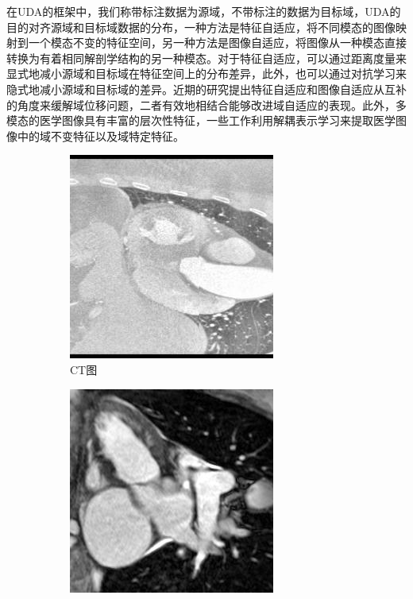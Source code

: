 在UDA的框架中，我们称带标注数据为源域，不带标注的数据为目标域，UDA的目的对齐源域和目标域数据的分布，一种方法是特征自适应\cite{long2017deep, sun2016deep, wu2020cf, wu2021unsupervised, dou2018pnp, tsai2018learning, vesal2021adapt}，将不同模态的图像映射到一个模态不变的特征空间，另一种方法是图像自适应\cite{zhu2017unpaired}，将图像从一种模态直接转换为有着相同解剖学结构的另一种模态。对于特征自适应，可以通过距离度量来显式地减小源域和目标域在特征空间上的分布差异，此外，也可以通过对抗学习来隐式地减小源域和目标域的差异。近期的研究\cite{hoffman2018cycada,chen2019synergistic}提出特征自适应和图像自适应从互补的角度来缓解域位移问题，二者有效地相结合能够改进域自适应的表现。此外，多模态的医学图像具有丰富的层次性特征，一些工作\cite{yang2019unsupervised, chartsias2019disentangled, pei2021disentangle}利用解耦表示学习来提取医学图像中的域不变特征以及域特定特征。
\begin{figure}
    \centering
    \begin{subfigure}{0.3\textwidth}
        \includegraphics[width=.8\textwidth,height=.8\textwidth]{image/chap01/ct.jpeg}
        \caption{CT图}
        \label{hist:a}
    \end{subfigure}
    \hfill
    \begin{subfigure}{0.3\textwidth}
        \includegraphics[width=.8\textwidth,height=.8\textwidth]{image/chap01/mr.jpeg}

\end{subfigure}
\end{figure}
